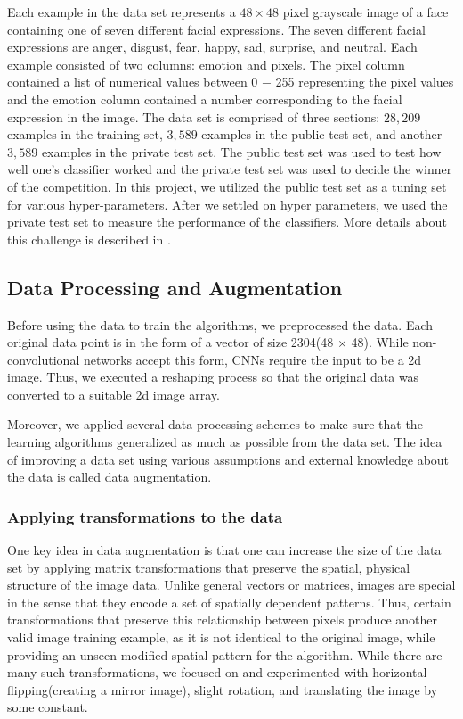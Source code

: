 \documentclass[11pt]{article}
\begin{document}
Each example in the data set represents a $48 \times 48$ pixel grayscale image of a face containing one of seven different facial expressions. The seven different facial expressions are anger, disgust, fear, happy, sad, surprise, and neutral. Each example consisted of two columns: emotion and pixels. The pixel column contained a list of numerical values between 0 $-$ 255 representing the pixel values and the emotion column contained a number corresponding to the facial expression in the image.  The data set is comprised of three sections: $28,209$ examples in the training set, $3,589$ examples in the public test set, and another $3,589$ examples in the private test set. The public test set was used to test how well one's classifier worked and the private test set was used to decide the winner of the competition. In this project, we utilized the public test set as a tuning set for various hyper-parameters. After we settled on hyper parameters, we used the private test set to measure the performance of the classifiers. More details about this challenge is described in \cite{goodfellow}.
	
	\subsection{Data Processing and Augmentation}
	Before using the data to train the algorithms, we preprocessed the data. Each original data point is in the form of a vector of size 2304(48 $\times$ 48). While non-convolutional networks accept this form, CNNs require the input to be a 2d image. Thus, we executed a reshaping process so that the original data was converted to a suitable 2d image array.
	
	Moreover, we applied several data processing schemes to make sure that the learning algorithms generalized as much as possible from the data set. The idea of improving a data set using various assumptions and external knowledge about the data is called data augmentation.
	
	\subsubsection{Applying transformations to the data}
	One key idea in data augmentation is that one can increase the size of the data set by applying matrix transformations that preserve the spatial, physical structure of the image data. Unlike general vectors or matrices, images are special in the sense that they encode
	a set of spatially dependent patterns. Thus, certain transformations that preserve this relationship between pixels produce another valid image training example, as it is not identical to the original image, while providing an unseen modified spatial pattern for the algorithm. While there are many such transformations, we focused on and experimented with horizontal flipping(creating a mirror image), slight rotation, and translating the image by some constant.
	
\end{document}
